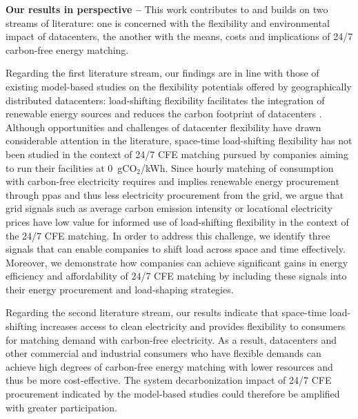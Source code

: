 %

\textbf{Our results in perspective --} This work contributes to and builds on two streams of literature: one is concerned with the flexibility and environmental impact of datacenters, the another with the means, costs and implications of 24/7 carbon-free energy matching.

Regarding the first literature stream, our findings are in line with those of existing model-based studies on the flexibility potentials offered by geographically distributed datacenters: load-shifting flexibility facilitates the integration of renewable energy sources and reduces the carbon footprint of datacenters \cite{zhengMitigatingCurtailmentCarbon2020, mahmudDistributedFrameworkCarbon2016, wangGreenawareVirtualMachine2015, kimDataCentersDispatchable2017, liuGeographicalLoadBalancing2011, kellyBalancingPowerSystems2016, lindbergEnvironmentalPotentialHyperScale2021}.
Although opportunities and challenges of datacenter flexibility have drawn considerable attention in the literature, space-time load-shifting flexibility has not been studied in the context of 24/7 CFE matching pursued by companies aiming to run their facilities at 0~gCO$_2$/kWh.
Since hourly matching of consumption with carbon-free electricity requires and implies renewable energy procurement through \gls{ppa}s and thus less electricity procurement from the grid, we argue that grid signals such as average carbon emission intensity or locational electricity prices have low value for informed use of load-shifting flexibility in the context of the 24/7 CFE matching.
In order to address this challenge, we identify three signals that can enable companies to shift load across space and time effectively.
Moreover, we demonstrate how companies can achieve significant gains in energy efficiency and affordability of 24/7 CFE matching by including these signals into their energy procurement and load-shaping strategies.

Regarding the second literature stream, our results indicate that space-time load-shifting increases access to clean electricity and provides flexibility to consumers for matching demand with carbon-free electricity.
As a result, datacenters and other commercial and industrial consumers who have flexible demands can achieve high degrees of carbon-free energy matching with lower resources and thus be more cost-effective.
The system decarbonization impact of 24/7 CFE procurement indicated by the model-based studies \cite{xu-247CFE-report,riepin-zenodo-systemlevel247} could therefore be amplified with greater participation.


